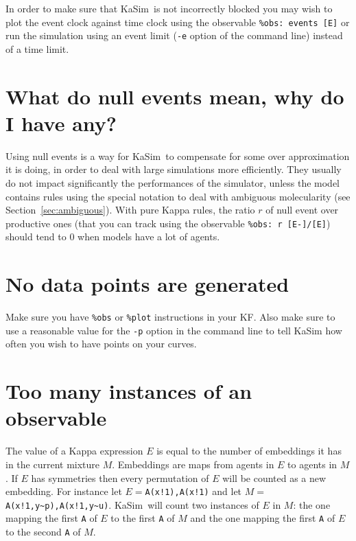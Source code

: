 \documentclass[11pt]{book}
\def\KaSim{\textsf{KaSim}}
\def\intstate{\textasciitilde}
\def\ttt#1{\texttt{#1}}
\begin{document}
In order to make sure that \KaSim~is not incorrectly blocked you may wish to plot the event clock against time clock using the observable \ttt{\%obs: {\textquotesingle}events{\textquotesingle} [E]} or run the simulation using an event limit (\ttt{-e} option of the command line) instead of a time limit.

\section*{What do null events mean, why do I have any?}

Using null events is a way for \KaSim~to compensate for some over approximation it is doing, in order to deal with large simulations more efficiently. They usually do not impact significantly the performances of the simulator, unless the model contains rules using the special notation to deal with ambiguous molecularity (see Section~\ref{sec:ambiguous}). With pure Kappa rules, the ratio $r$ of null event over productive ones (that you can track using the observable \ttt{\%obs: {\textquotesingle}r{\textquotesingle}  [E-]/[E]}) should tend to 0 when models have a lot of agents.

\section*{No data points are generated}
Make sure you have \ttt{\%obs} or \ttt{\%plot} instructions in your KF. Also make sure to use a reasonable value for the \ttt{-p} option in the command line to tell KaSim how often you wish to have points on your curves.

\section*{Too many instances of an observable}
The value of a Kappa expression $E$  is equal to the number of embeddings it has in the current mixture $M$. Embeddings are maps from agents in $E$  to agents in $M$. If $E$ has symmetries then every permutation of $E$ will be counted as a new embedding. For instance let $E=$\ttt{A(x!1),A(x!1)}  and let $M=$\ttt{A(x!1,y\intstate p),A(x!1,y\intstate u)}.
\KaSim~will count two instances of $E$ in $M$: the one mapping the first \ttt{A} of $E$ to the first \ttt{A} of $M$ and the one mapping the first \ttt{A} of $E$ to the second \ttt{A} of $M$.
\end{document}

